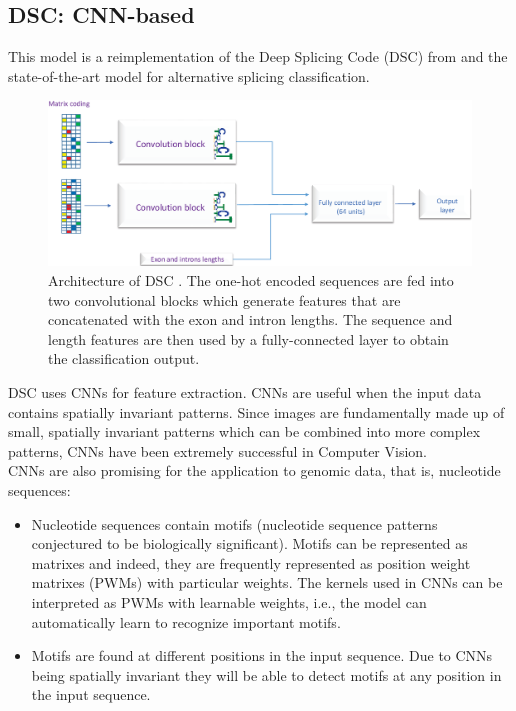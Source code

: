 \subsection{DSC: CNN-based} \label{subsec:dsc}
This model is a reimplementation of the Deep Splicing Code (DSC) from \cite{dsc} and the state-of-the-art model for alternative splicing classification. 

\begin{figure}
	\centering\includegraphics[width=1\textwidth]{../visualizations/ch4-methods/dsc_architecture.png} 
	\caption{
		Architecture of DSC \cite{dsc}. The one-hot encoded sequences are fed into two convolutional blocks which generate features that are concatenated with the exon and intron lengths. The sequence and length features are then used by a fully-connected layer to obtain the classification output.
	}
	\label{fig:dsc_architecture}
\end{figure}
DSC uses CNNs for feature extraction. 
CNNs are useful when the input data contains spatially invariant patterns.  Since images are fundamentally made up of small, spatially invariant patterns which can be combined into more complex patterns, CNNs have been extremely successful in Computer Vision.\\
CNNs are also promising for the application to genomic data, that is, nucleotide sequences: 
\begin{itemize}
	\item Nucleotide sequences contain motifs (nucleotide sequence patterns conjectured to be biologically significant). Motifs can be represented as matrixes and indeed, they are frequently represented as position weight matrixes (PWMs) with particular weights. The kernels used in CNNs can be interpreted as PWMs with learnable weights, i.e., the model can automatically learn to recognize important motifs.
	\item Motifs are found at different positions in the input sequence. Due to CNNs being spatially invariant they will be able to detect motifs at any position in the input sequence.
\end{itemize}

